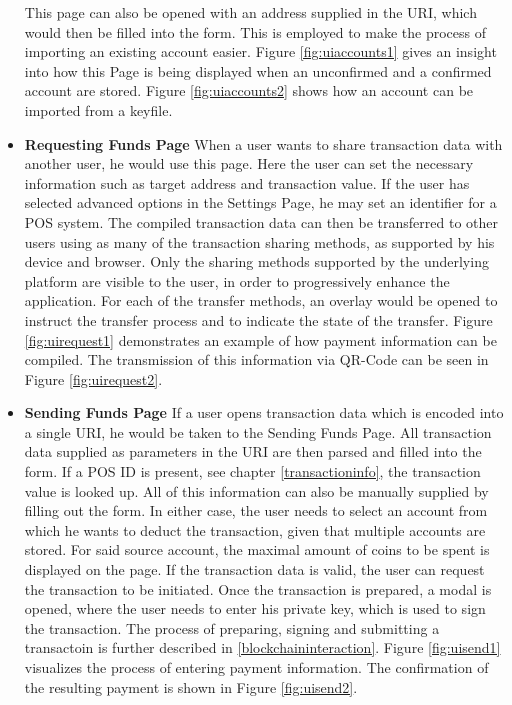 \begin{itemize}
This page can also be opened with an address supplied in the URI, which would then be filled into the form. This is employed to make the process of importing an existing account easier. Figure \ref{fig:uiaccounts1} gives an insight into how this Page is being displayed when an unconfirmed and a confirmed account are stored. Figure \ref{fig:uiaccounts2} shows how an account can be imported from a keyfile.
\item \textbf{Requesting Funds Page}
When a user wants to share transaction data with another user, he would use this page. Here the user can set the necessary information such as target address and transaction value. If the user has selected advanced options in the Settings Page, he may set an identifier for a POS system.
The compiled transaction data can then be transferred to other users using as many of the transaction sharing methods, as supported by his device and browser. Only the sharing methods supported by the underlying platform are visible to the user, in order to progressively enhance the application. For each of the transfer methods, an overlay would be opened to instruct the transfer process and to indicate the state of the transfer. Figure \ref{fig:uirequest1} demonstrates an example of how payment information can be compiled. The transmission of this information via QR-Code can be seen in Figure \ref{fig:uirequest2}.

\item \textbf{Sending Funds Page}
If a user opens transaction data which is encoded into a single URI, he would be taken to the Sending Funds Page.
All transaction data supplied as parameters in the URI are then parsed and filled into the form. If a POS ID is present, see chapter \ref{transactioninfo}, the transaction value is looked up. All of this information can also be manually supplied by filling out the form. In either case, the user needs to select an account from which he wants to deduct the transaction, given that multiple accounts are stored. For said source account, the maximal amount of coins to be spent is displayed on the page. If the transaction data is valid, the user can request the transaction to be initiated. Once the transaction is prepared, a modal is opened, where the user needs to enter his private key, which is used to sign the transaction. The process of preparing, signing and submitting a transactoin is further described in \ref{blockchaininteraction}. Figure \ref{fig:uisend1} visualizes the process of entering payment information. The confirmation of the resulting payment is shown in Figure \ref{fig:uisend2}.


\end{itemize}

